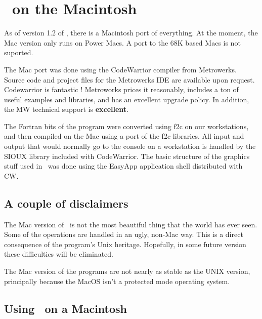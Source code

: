 \chapter{\prog\ on the Macintosh}

As of version 1.2 of \prog, there is a Macintosh port of everything.
At the moment, the Mac version only runs on Power Macs.
A port to the 68K based Macs is not suported.


The Mac port was done using the CodeWarrior compiler from Metrowerks.
Source code and project files for the Metrowerks IDE are available
upon request.
Codewarrior is fantastic ! Metroworks prices it reasonably, includes a ton of
useful examples and libraries, and has an
excellent upgrade policy.  In addition, the MW technical support is
{\bf excellent}.

The Fortran bits of the program were converted using f2c on our
workstations, and then compiled on the Mac using a port of the f2c
libraries.  All input and output that would normally go to the
console on a workstation is handled by the SIOUX library included with
CodeWarrior.  The basic structure of the graphics stuff used in
\viewprog\ was done using the EasyApp application shell distributed
with CW.

\section{A couple of disclaimers}
The Mac version of \prog\ is not the most beautiful thing that the
world has ever seen.  Some of the operations are handled in an ugly,
non-Mac way.  This is a direct consequence of the program's
Unix heritage.  Hopefully, in some future version these 
difficulties will be eliminated.

The Mac version of the programs are not nearly as stable as the UNIX
version, principally because the MacOS isn't a
protected mode operating system.

\section{Using \calcprog\ on a Macintosh}

